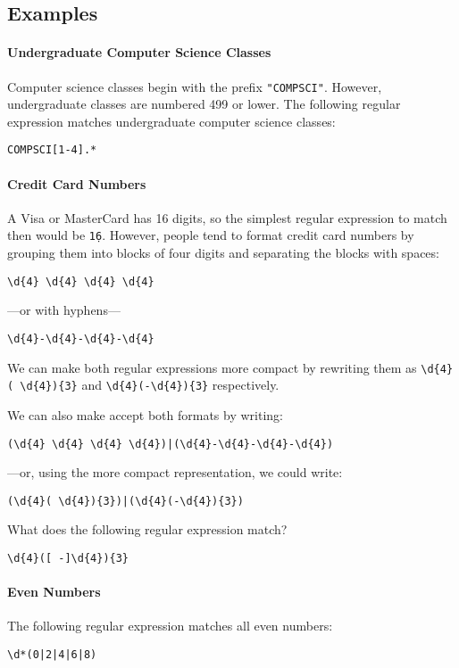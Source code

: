 \subsection{Examples}

\paragraph{Undergraduate Computer Science Classes} Computer science classes begin with the prefix \texttt{"COMPSCI"}. However, undergraduate classes are numbered 499 or lower. The following regular expression matches undergraduate computer science classes:

\texttt{COMPSCI[1-4].*}

\paragraph{Credit Card Numbers}
A Visa or MasterCard has 16 digits, so the simplest regular expression to match then would be \texttt{\d{16}}. However, people tend to format credit card numbers by grouping them into blocks of four digits and separating the blocks with spaces:

\begin{verbatim}
\d{4} \d{4} \d{4} \d{4}
\end{verbatim}

---or with hyphens---

\begin{verbatim}
\d{4}-\d{4}-\d{4}-\d{4}
\end{verbatim}

We can make both regular expressions more compact by rewriting them as \verb|\d{4}( \d{4}){3}| and \verb|\d{4}(-\d{4}){3}| respectively.

We can also make accept both formats by writing:

\begin{verbatim}
(\d{4} \d{4} \d{4} \d{4})|(\d{4}-\d{4}-\d{4}-\d{4})
\end{verbatim}

---or, using the more compact representation, we could write:
\begin{verbatim}
(\d{4}( \d{4}){3})|(\d{4}(-\d{4}){3})
\end{verbatim}


\begin{think}

What does the following regular expression match?

\begin{verbatim}
\d{4}([ -]\d{4}){3}
\end{verbatim}
\end{think}

\paragraph{Even Numbers}

The following regular expression matches all even numbers:

\begin{verbatim}
\d*(0|2|4|6|8)
\end{verbatim}


